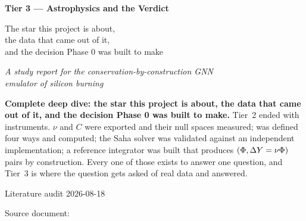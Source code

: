 
\begin{titlepage}
\centering
\vspace*{3.0cm}

{\Huge\bfseries Tier 3 --- Astrophysics and the Verdict\par}

\vspace{1.2em}
{\Large The star this project is about,\\[0.3em]
the data that came out of it,\\[0.3em]
and the decision Phase 0 was built to make\par}

\vspace{0.8em}
{\large\itshape A study report for the conservation-by-construction GNN\\
emulator of silicon burning\par}

\vspace{2.6em}
\begin{minipage}{0.84\textwidth}
\small
\textbf{Complete deep dive: the star this project is about, the data that came
out of it, and the decision Phase 0 was built to make.}
Tier~2 ended with instruments. $\nu$ and $C$ were exported and their null
spaces measured; \kap{} was defined four ways and computed; the Saha solver was
validated against an independent implementation; a reference integrator was
built that produces $(\Phi, \Delta Y = \nu\Phi)$ pairs by construction.
Every one of those exists to answer one question, and Tier~3 is where the
question gets asked of real data and answered.
\end{minipage}

\vfill
{\small Literature audit 2026-08-18\par}
\vspace{0.5em}
{\small Source document: \par}
\end{titlepage}

